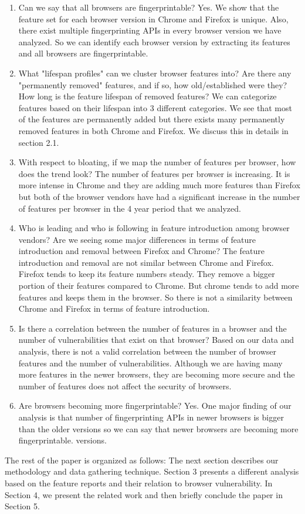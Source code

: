 \begin{enumerate}
  \item Can we say that all browsers are fingerprintable?
  Yes. We show that the feature set for each browser version in Chrome and Firefox is unique. Also, there exist multiple fingerprinting APIs in every browser version we have analyzed. So we can identify each browser version by extracting its features and all browsers are fingerprintable.
  \item What "lifespan profiles" can we cluster browser features into? Are there any "permanently removed" features, and if so, how old/established were they? How long is the feature lifespan of removed features? We can categorize features based on their lifespan into 3 different categories. We see that most of the features are permanently added but there exists many permanently removed features in both Chrome and Firefox. We discuss this in details in section 2.1.
  \item With respect to bloating, if we map the number of features per browser, how does the trend look? The number of features per browser is increasing. It is more intense in Chrome and they are adding much more features than Firefox but both of the browser vendors have had a significant increase in the number of features per browser in the 4 year period that we analyzed.
  \item Who is leading and who is following in feature introduction among browser vendors? Are we seeing some major differences in terms of feature introduction and removal between Firefox and Chrome? The feature introduction and removal are not similar between Chrome and Firefox. Firefox tends to keep its feature numbers steady. They remove a bigger portion of their features compared to Chrome. But chrome tends to add more features and keeps them in the browser. So there is not a similarity between Chrome and Firefox in terms of feature introduction.
  \item Is there a correlation between the number of features in a browser and the number of vulnerabilities that exist on that browser? Based on our data and analysis, there is not a valid correlation between the number of browser features and the number of vulnerabilities. Although we are having many more features in the newer browsers, they are becoming more secure and the number of features does not affect the security of browsers.
  \item Are browsers becoming more fingerprintable? Yes. One major finding of our analysis is that number of fingerprinting APIs in newer browsers is bigger than the older versions so we can say that newer browsers are becoming more fingerprintable. versions.
\end{enumerate}

The rest of the paper is organized as follows: The next section describes our methodology and data gathering technique. Section 3 presents a different analysis based on the feature reports and their relation to browser vulnerability. In Section 4, we present the related work and then briefly conclude the paper in Section 5.

